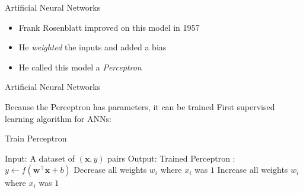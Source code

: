 \begin{slide}{Artificial Neural Networks}
  \begin{itemize}
    \item<1-> Frank Rosenblatt improved on this model in 1957
    \item<2-> He \emph{weighted} the inputs and added a bias
    \item<3-> He called this model a \emph{Perceptron}
  \end{itemize}
  \vspace{0.5cm}

\end{slide}

\renewcommand{\thealgorithm}{}
\begin{slide}{Artificial Neural Networks}
  \begin{itemize}
    \pitem Because the Perceptron has parameters, it can be trained
    \pitem First supervised learning algorithm for ANNs:
  \end{itemize}
  \pause
  \begin{algorithm}[H]
  \caption{Train Perceptron}
  \begin{algorithmic}
  \State Input: A dataset of $(\mathbf{x}, \hat{y})$ pairs
  \State Output: Trained Perceptron
  :
    \State $y \gets f(\mathbf{w}^\top \mathbf{x} + b)$
        \State Decrease all weights $w_i$ where $x_i$ was $1$
        \State Increase all weights $w_i$ where $x_i$ was $1$
      \EndIf
    \EndIf
  \EndFor
  \end{algorithmic}
  \end{algorithm}
\end{slide}

